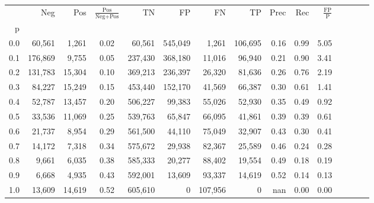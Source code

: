 \begin{tabular}{rrrcrrrrrrrrrrr}
\toprule
{} &      Neg &     Pos & $\frac{\text{Pos}}{\text{Neg}+\text{Pos}}$ &       TN &       FP &       FN &       TP &  Prec &   Rec & $\frac{\text{FP}}{\text{P}}$ \\
p   &          &         &                                            &          &          &          &          &       &       &                              \\
\midrule
0.0 &   60,561 &   1,261 &                                       0.02 &   60,561 &  545,049 &    1,261 &  106,695 &  0.16 &  0.99 &                         5.05 \\
0.1 &  176,869 &   9,755 &                                       0.05 &  237,430 &  368,180 &   11,016 &   96,940 &  0.21 &  0.90 &                         3.41 \\
0.2 &  131,783 &  15,304 &                                       0.10 &  369,213 &  236,397 &   26,320 &   81,636 &  0.26 &  0.76 &                         2.19 \\
0.3 &   84,227 &  15,249 &                                       0.15 &  453,440 &  152,170 &   41,569 &   66,387 &  0.30 &  0.61 &                         1.41 \\
0.4 &   52,787 &  13,457 &                                       0.20 &  506,227 &   99,383 &   55,026 &   52,930 &  0.35 &  0.49 &                         0.92 \\
0.5 &   33,536 &  11,069 &                                       0.25 &  539,763 &   65,847 &   66,095 &   41,861 &  0.39 &  0.39 &                         0.61 \\
0.6 &   21,737 &   8,954 &                                       0.29 &  561,500 &   44,110 &   75,049 &   32,907 &  0.43 &  0.30 &                         0.41 \\
0.7 &   14,172 &   7,318 &                                       0.34 &  575,672 &   29,938 &   82,367 &   25,589 &  0.46 &  0.24 &                         0.28 \\
0.8 &    9,661 &   6,035 &                                       0.38 &  585,333 &   20,277 &   88,402 &   19,554 &  0.49 &  0.18 &                         0.19 \\
0.9 &    6,668 &   4,935 &                                       0.43 &  592,001 &   13,609 &   93,337 &   14,619 &  0.52 &  0.14 &                         0.13 \\
1.0 &   13,609 &  14,619 &                                       0.52 &  605,610 &        0 &  107,956 &        0 &   nan &  0.00 &                         0.00 \\
\bottomrule
\end{tabular}
